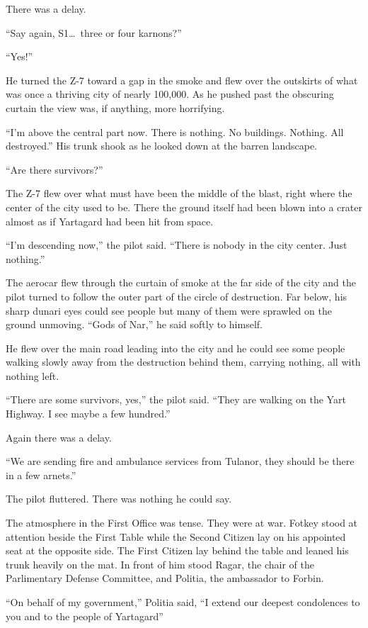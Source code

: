There was a delay.

``Say again, S1\ldots\ three or four karnons?''

``Yes!''

He turned the Z-7 toward a gap in the smoke and flew over the outskirts of what was once a
thriving city of nearly 100,000. As he pushed past the obscuring curtain the view was, if
anything, more horrifying.

``I'm above the central part now. There is nothing. No buildings. Nothing. All destroyed.'' His
trunk shook as he looked down at the barren landscape.

``Are there survivors?''

The Z-7 flew over what must have been the middle of the blast, right where the center of the
city used to be. There the ground itself had been blown into a crater almost as if Yartagard had
been hit from space.

``I'm descending now,'' the pilot said. ``There is nobody in the city center. Just nothing.''

The aerocar flew through the curtain of smoke at the far side of the city and the pilot turned
to follow the outer part of the circle of destruction. Far below, his sharp dunari eyes could
see people but many of them were sprawled on the ground unmoving. ``Gods of Nar,'' he said
softly to himself.

He flew over the main road leading into the city and he could see some people walking slowly
away from the destruction behind them, carrying nothing, all with nothing left.

``There are some survivors, yes,'' the pilot said. ``They are walking on the Yart Highway. I see
maybe a few hundred.''

Again there was a delay.

``We are sending fire and ambulance services from Tulanor, they should be there in a few
arnets.''

The pilot fluttered. There was nothing he could say.

\spacebreak

The atmosphere in the First Office was tense. They were at war. Fotkey stood at attention beside
the First Table while the Second Citizen lay on his appointed seat at the opposite side. The
First Citizen lay behind the table and leaned his trunk heavily on the mat. In front of him
stood Ragar, the chair of the Parlimentary Defense Committee, and Politia, the ambassador to
Forbin.

``On behalf of my government,'' Politia said, ``I extend our deepest condolences to you and to
the people of Yartagard''

